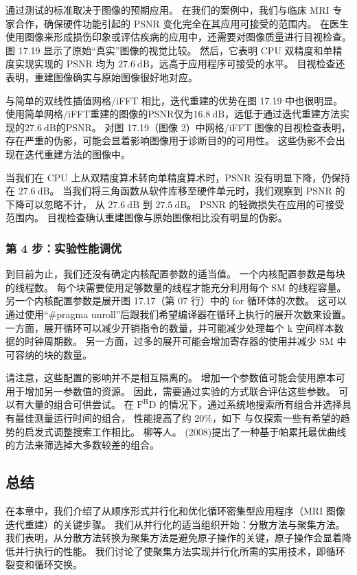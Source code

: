 通过测试的标准取决于图像的预期应用。 
在我们的案例中，我们与临床 MRI 专家合作，确保硬件功能引起的 PSNR 变化完全在其应用可接受的范围内。 
在医生使用图像来形成损伤印象或评估疾病的应用中，还需要对图像质量进行目视检查。 
图 17.19 显示了原始“真实”图像的视觉比较。 
然后，它表明 CPU 双精度和单精度实现实现的 PSNR 均为 $27.6 \mathrm{~dB}$，远高于应用程序可接受的水平。 
目视检查还表明，重建图像确实与原始图像很好地对应。

与简单的双线性插值网格/iFFT 相比，迭代重建的优势在图 17.19 中也很明显。 
使用简单网格/iFFT重建的图像的PSNR仅为$16.8 \mathrm{~dB}$，远低于通过迭代重建方法实现的$27.6 \mathrm{~dB}$的PSNR。 
对图 17.19（图像 2）中网格/iFFT 图像的目视检查表明，存在严重的伪影，可能会显着影响图像用于诊断目的的可用性。 
这些伪影不会出现在迭代重建方法的图像中。

当我们在 CPU 上从双精度算术转向单精度算术时，PSNR 没有明显下降，仍保持在 $27.6 \mathrm{~dB}$。 
当我们将三角函数从软件库移至硬件单元时，我们观察到 PSNR 的下降可以忽略不计，
从 $27.6 \mathrm{~dB}$ 到 $27.5 \mathrm{~dB}$。 PSNR 的轻微损失在应用的可接受范围内。 
目视检查确认重建图像与原始图像相比没有明显的伪影。

\subsubsection{第 4 步：实验性能调优}
到目前为止，我们还没有确定内核配置参数的适当值。 一个内核配置参数是每块的线程数。 
每个块需要使用足够数量的线程才能充分利用每个 SM 的线程容量。 
另一个内核配置参数是展开图 17.17（第 07 行）中的 for 循环体的次数。 
这可以通过使用“\#pragma unroll”后跟我们希望编译器在循环上执行的展开次数来设置。 
一方面，展开循环可以减少开销指令的数量，并可能减少处理每个 k 空间样本数据的时钟周期数。 
另一方面，过多的展开可能会增加寄存器的使用并减少 SM 中可容纳的块的数量。

请注意，这些配置的影响并不是相互隔离的。 增加一个参数值可能会使用原本可用于增加另一参数值的资源。 
因此，需要通过实验的方式联合评估这些参数。 可以有大量的组合可供尝试。 
在 $\mathrm{F}^{\mathrm{H}} \mathrm{D}$ 的情况下，通过系统地搜索所有组合并选择具有最佳测量运行时间的组合，
性能提高了约 $20 \%$，如下 与仅探索一些有希望的趋势的启发式调整搜索工作相比。 
柳等人。 (2008)提出了一种基于帕累托最优曲线的方法来筛选掉大多数较差的组合。

\subsection{总结}
在本章中，我们介绍了从顺序形式并行化和优化循环密集型应用程序（MRI 图像迭代重建）的关键步骤。 
我们从并行化的适当组织开始：分散方法与聚集方法。 
我们表明，从分散方法转换为聚集方法是避免原子操作的关键，原子操作会显着降低并行执行的性能。 
我们讨论了使聚集方法实现并行化所需的实用技术，即循环裂变和循环交换。

